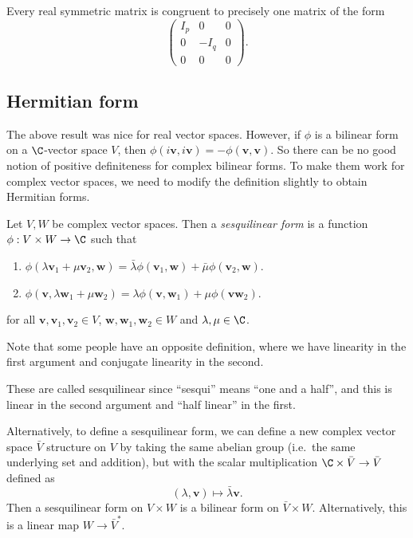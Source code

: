 \documentclass[a4paper]{article}
\begin{document}
\begin{cor}
  Every real symmetric matrix is congruent to precisely one matrix of the form
  \[
    \begin{pmatrix}
      I_p & 0 & 0\\
      0 & -I_q & 0\\
      0 & 0 & 0
    \end{pmatrix}.
  \]
\end{cor}
\subsection{Hermitian form}
The above result was nice for real vector spaces. However, if $\phi$ is a bilinear form on a $\C$-vector space $V$, then $\phi(i\mathbf{v}, i\mathbf{v}) = -\phi(\mathbf{v}, \mathbf{v})$. So there can be no good notion of positive definiteness for complex bilinear forms. To make them work for complex vector spaces, we need to modify the definition slightly to obtain Hermitian forms.

\begin{defi}
  Let $V, W$ be complex vector spaces. Then a \emph{sesquilinear form} is a function $\phi: V \times W \to \C$ such that
  \begin{enumerate}
    \item $\phi(\lambda \mathbf{v}_1 + \mu \mathbf{v}_2, \mathbf{w}) = \bar{\lambda} \phi(\mathbf{v}_1, \mathbf{w}) + \bar{\mu}\phi(\mathbf{v}_2, \mathbf{w})$.
    \item $\phi(\mathbf{v}, \lambda \mathbf{w}_1 + \mu \mathbf{w}_2) = \lambda \phi(\mathbf{v}, \mathbf{w}_1) + \mu \phi(\mathbf{v} \mathbf{w}_2)$.
  \end{enumerate}
  for all $\mathbf{v}, \mathbf{v}_1, \mathbf{v}_2 \in V$, $\mathbf{w}, \mathbf{w}_1, \mathbf{w}_2 \in W$ and $\lambda, \mu \in \C$.
\end{defi}
Note that some people have an opposite definition, where we have linearity in the first argument and conjugate linearity in the second.

These are called sesquilinear since ``sesqui'' means ``one and a half'', and this is linear in the second argument and ``half linear'' in the first.

Alternatively, to define a sesquilinear form, we can define a new complex vector space $\bar{V}$ structure on $V$ by taking the same abelian group (i.e.\ the same underlying set and addition), but with the scalar multiplication $\C \times \bar{V} \to \bar{V}$ defined as
\[
  (\lambda, \mathbf{v}) \mapsto \bar{\lambda} \mathbf{v}.
\]
Then a sesquilinear form on $V\times W$ is a bilinear form on $\bar{V} \times W$. Alternatively, this is a linear map $W \to \bar{V}^*$.
\end{document}
